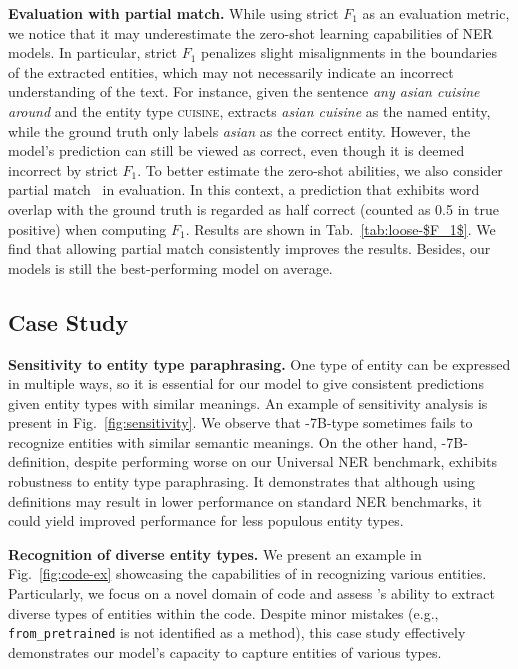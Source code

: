 \smallskip
\noindent\textbf{Evaluation with partial match.}
While using strict $F_1$ as an evaluation metric, we notice that it may underestimate the zero-shot learning capabilities of NER models.
In particular, strict $F_1$ penalizes slight misalignments in the boundaries of the extracted entities, which may not necessarily indicate an incorrect understanding of the text. 
For instance, given the sentence \textit{any asian cuisine around} and the entity type \textsc{cuisine}, \shortname extracts \textit{asian cuisine} as the named entity, while the ground truth only labels \textit{asian} as the correct entity.
However, the model's prediction can still be viewed as correct, even though it is deemed incorrect by strict $F_1$.
To better estimate the zero-shot abilities, we also consider partial match~\citep{segura2013semeval} in evaluation.
In this context, a prediction that exhibits word overlap with the ground truth is regarded as half correct (counted as 0.5 in true positive) when computing $F_1$.
Results are shown in Tab.~\ref{tab:loose-$F_1$}.
We find that allowing partial match consistently improves the results.
Besides, our models is still the best-performing model on average.

\subsection{Case Study}
\label{ssec:case_study}

\smallskip
\noindent \textbf{Sensitivity to entity type paraphrasing.}
One type of entity can be expressed in multiple ways, so it is essential for our model to give consistent predictions given entity types with similar meanings.
An example of sensitivity analysis is present in Fig.~\ref{fig:sensitivity}.
We observe that \shortname-7B-type %
sometimes fails to recognize entities with similar semantic meanings.
On the other hand, \shortname-7B-definition, despite performing worse on our Universal NER benchmark, exhibits robustness to entity type paraphrasing.
It demonstrates that although using definitions may result in lower performance on standard NER benchmarks, it could yield improved performance for less populous entity types.

\smallskip
\noindent \textbf{Recognition of diverse entity types.}
We present an example in Fig.~\ref{fig:code-ex} showcasing the capabilities of \shortname in recognizing various entities.
Particularly, we focus on a novel domain of code and assess \shortname's ability to extract diverse types of entities within the code.
Despite minor mistakes (e.g., \texttt{from\_pretrained} is not identified as a method), this case study effectively demonstrates our model's capacity to capture entities of various types.

